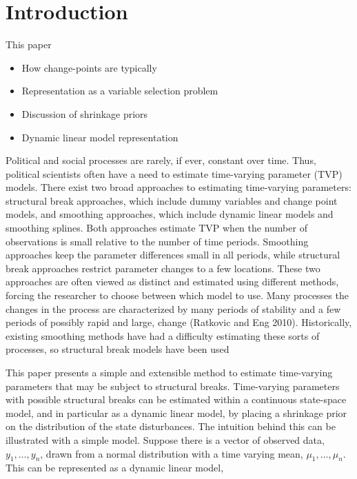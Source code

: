 
\newcommand{\ModelII}[1]{\texttt{#1}}

\section{Introduction}
\label{dlm:sec:introduction}

This paper 


\begin{itemize}
\item How change-points are typically 
\item Representation as a variable selection problem
\item Discussion of shrinkage priors
\item Dynamic linear model representation
\end{itemize}

Political and social processes are rarely, if ever, constant over time.
Thus, political scientists often have a need to estimate time-varying parameter (TVP) models.
There exist two broad approaches to estimating time-varying parameters: structural break approaches, which include dummy variables and change point models, and smoothing approaches, which include dynamic linear models and smoothing splines. 
Both approaches estimate TVP when the number of observations is small relative to the number of time periods. 
Smoothing approaches keep the parameter differences small in all periods, while structural break approaches restrict parameter changes to a few locations. 
These two approaches are often viewed as distinct and estimated using different methods, forcing the researcher to choose between which model to use.
Many processes the changes in the process are characterized by many periods of stability and a few periods of possibly rapid and large, change (Ratkovic and Eng 2010).
Historically, existing smoothing methods have had a difficulty estimating these sorts of processes, so structural break models have been used

This paper presents a simple and extensible method to estimate time-varying parameters that may be subject to structural breaks. 
Time-varying parameters with possible structural breaks can be estimated within a continuous state-space model, and in particular as a dynamic linear model, by placing a shrinkage prior on the distribution of the state disturbances.
The intuition behind this can be illustrated with a simple model.
Suppose there is a vector of observed data, $y_{1}, \dots, y_{n}$, drawn from a normal distribution with a time varying mean, $\mu_{1}, \dots, \mu_{n}$.
This can be represented as a dynamic linear model,

